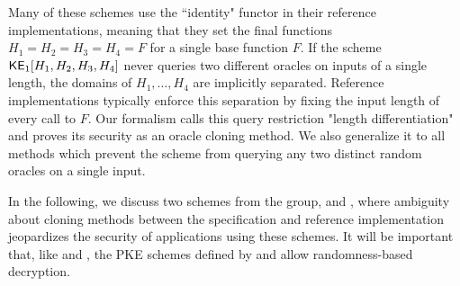  Many of these schemes use the ``identity" functor in their reference implementations, meaning that they set the final functions $H_1 = H_2 = H_3 = H_4 = F$ for a single base function $F$. 
If the scheme ${\mathsf{KE}}_1[H_1,H_2,H_3,H_4]$ never queries two different oracles on inputs of a single length, the  domains of $H_1,\ldots,H_4$ are implicitly separated.
Reference implementations typically enforce this separation by fixing the input length of every call to $F$. 
Our formalism calls this query restriction "length differentiation" and proves its security as an oracle cloning method. We also generalize it to all methods which prevent the scheme from querying any two distinct random oracles on a single input. 

In the following, we discuss two schemes from the group,  and , where ambiguity about cloning methods between the specification and reference implementation jeopardizes the security of applications using these schemes. It will be important that, like  and , the PKE schemes defined by  and  allow randomness-based decryption. 


